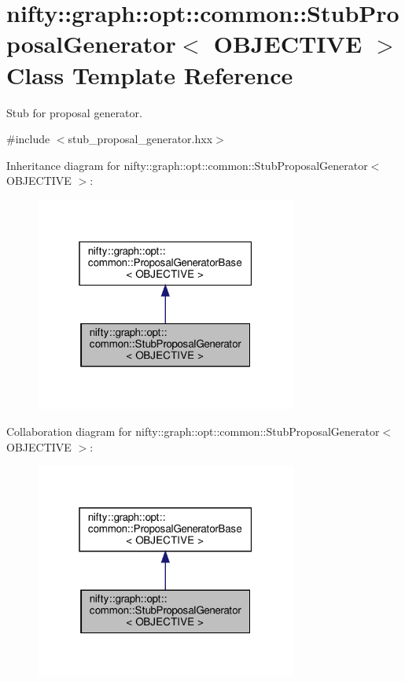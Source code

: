 \hypertarget{classnifty_1_1graph_1_1opt_1_1common_1_1StubProposalGenerator}{}\section{nifty\+:\+:graph\+:\+:opt\+:\+:common\+:\+:Stub\+Proposal\+Generator$<$ O\+B\+J\+E\+C\+T\+I\+VE $>$ Class Template Reference}
\label{classnifty_1_1graph_1_1opt_1_1common_1_1StubProposalGenerator}


Stub for proposal generator.  




{\ttfamily \#include $<$stub\+\_\+proposal\+\_\+generator.\+hxx$>$}



Inheritance diagram for nifty\+:\+:graph\+:\+:opt\+:\+:common\+:\+:Stub\+Proposal\+Generator$<$ O\+B\+J\+E\+C\+T\+I\+VE $>$\+:
\nopagebreak
\begin{figure}[H]
\begin{center}
\leavevmode
\includegraphics[width=244pt]{classnifty_1_1graph_1_1opt_1_1common_1_1StubProposalGenerator__inherit__graph}
\end{center}
\end{figure}


Collaboration diagram for nifty\+:\+:graph\+:\+:opt\+:\+:common\+:\+:Stub\+Proposal\+Generator$<$ O\+B\+J\+E\+C\+T\+I\+VE $>$\+:
\nopagebreak
\begin{figure}[H]
\begin{center}
\leavevmode
\includegraphics[width=244pt]{classnifty_1_1graph_1_1opt_1_1common_1_1StubProposalGenerator__coll__graph}
\end{center}
\end{figure}
